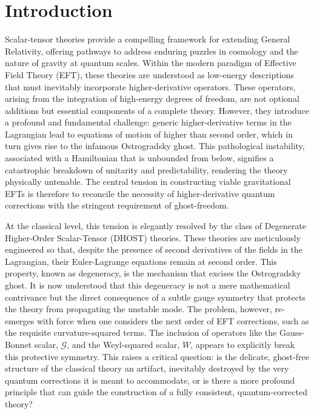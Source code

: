 \documentclass[twocolumn]{aastex631}
\begin{document}
\section{Introduction}
\label{sec:intro}
Scalar-tensor theories provide a compelling framework for extending General Relativity, offering pathways to address enduring puzzles in cosmology and the nature of gravity at quantum scales. Within the modern paradigm of Effective Field Theory (EFT), these theories are understood as low-energy descriptions that must inevitably incorporate higher-derivative operators. These operators, arising from the integration of high-energy degrees of freedom, are not optional additions but essential components of a complete theory. However, they introduce a profound and fundamental challenge: generic higher-derivative terms in the Lagrangian lead to equations of motion of higher than second order, which in turn gives rise to the infamous Ostrogradsky ghost. This pathological instability, associated with a Hamiltonian that is unbounded from below, signifies a catastrophic breakdown of unitarity and predictability, rendering the theory physically untenable. The central tension in constructing viable gravitational EFTs is therefore to reconcile the necessity of higher-derivative quantum corrections with the stringent requirement of ghost-freedom.

At the classical level, this tension is elegantly resolved by the class of Degenerate Higher-Order Scalar-Tensor (DHOST) theories. These theories are meticulously engineered so that, despite the presence of second derivatives of the fields in the Lagrangian, their Euler-Lagrange equations remain at second order. This property, known as degeneracy, is the mechanism that excises the Ostrogradsky ghost. It is now understood that this degeneracy is not a mere mathematical contrivance but the direct consequence of a subtle gauge symmetry that protects the theory from propagating the unstable mode. The problem, however, re-emerges with force when one considers the next order of EFT corrections, such as the requisite curvature-squared terms. The inclusion of operators like the Gauss-Bonnet scalar, $\mathcal{G}$, and the Weyl-squared scalar, $W$, appears to explicitly break this protective symmetry. This raises a critical question: is the delicate, ghost-free structure of the classical theory an artifact, inevitably destroyed by the very quantum corrections it is meant to accommodate, or is there a more profound principle that can guide the construction of a fully consistent, quantum-corrected theory?
\end{document}
